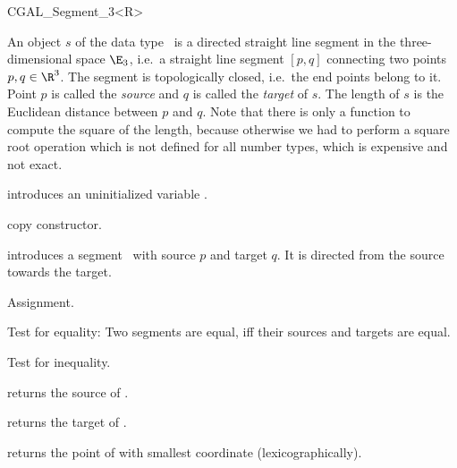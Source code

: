 
\begin {classtemplate} {CGAL_Segment_3<R>}

  An object $s$ of the data type \classname\ is a directed
straight line segment in the three-dimensional space $\E_3$, i.e.\ a
straight line segment $[p,q]$ connecting two points $p,q \in
\R^3$. The segment is topologically closed, i.e.\  the end
points belong to it. Point $p$ is called the {\em source} and $q$
is called the {\em target} of $s$. The length of $s$ is the
Euclidean distance between $p$ and $q$. Note that there is only a function
to compute the square of the length, because otherwise we had to
perform a square root operation which is not defined for all
number types, which is expensive and not exact.

\creation
{}


\hidden {}
             {introduces an uninitialized variable \var.}

\hidden {}
 	    {copy constructor.}

            {introduces a segment \var\ with source $p$
             and target $q$. It is directed from the source towards
             the target.}


\operations
\threecolumns{5cm}{4cm}

\hidden {}
        {Assignment.}

       {Test for equality: Two segments are equal, iff their sources and
        targets are equal.}

       {Test for inequality.}



       {returns the source  of \var.}

       {returns the target of \var.}

       {returns the point of \var with smallest coordinate (lexicographically).}


\end{classtemplate}
